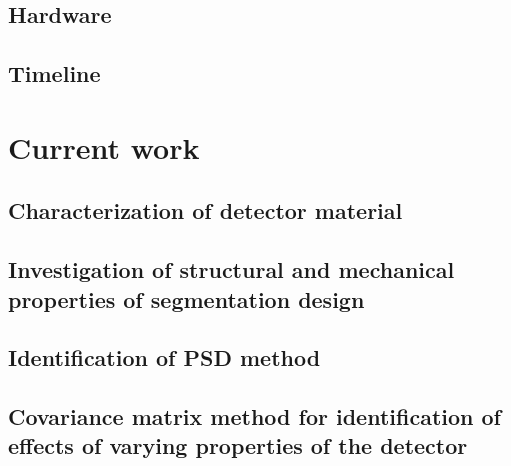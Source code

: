 \documentclass[11pt]{article}
\begin{document}
\subsection{Hardware}

\subsection{Timeline}

\section{Current work}

\subsection{Characterization of detector material}

\subsection{Investigation of structural and mechanical properties of segmentation design}

\subsection{Identification of PSD method}

\subsection{Covariance matrix method for identification of effects of varying properties of the detector}

\subsection{}




\end{document}

